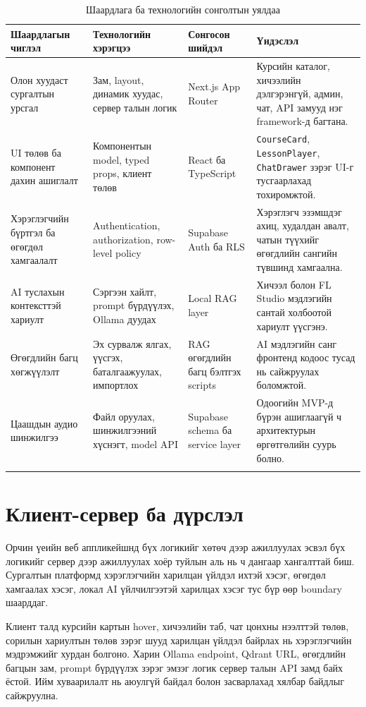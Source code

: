 \begin{longtable}{|p{}|p{}|p{}|p{}|}
  \hline
  \textbf{Шаардлагын чиглэл} & \textbf{Технологийн хэрэгцээ} & \textbf{Сонгосон шийдэл} & \textbf{Үндэслэл} \\ \hline
  Олон хуудаст сургалтын урсгал & Зам, layout, динамик хуудас, сервер талын логик & Next.js App Router & Курсийн каталог, хичээлийн дэлгэрэнгүй, админ, чат, API замууд нэг framework-д багтана. \\ \hline
  UI төлөв ба компонент дахин ашиглалт & Компонентын model, typed props, клиент төлөв & React ба TypeScript & \texttt{CourseCard}, \texttt{LessonPlayer}, \texttt{ChatDrawer} зэрэг UI-г тусгаарлахад тохиромжтой. \\ \hline
  Хэрэглэгчийн бүртгэл ба өгөгдөл хамгаалалт & Authentication, authorization, row-level policy & Supabase Auth ба RLS & Хэрэглэгч эзэмшдэг ахиц, худалдан авалт, чатын түүхийг өгөгдлийн сангийн түвшинд хамгаална. \\ \hline
  AI туслахын контексттэй хариулт & Сэргээн хайлт, prompt бүрдүүлэх, Ollama дуудах & Local RAG layer & Хичээл болон FL Studio мэдлэгийн сантай холбоотой хариулт үүсгэнэ. \\ \hline
  Өгөгдлийн багц хөгжүүлэлт & Эх сурвалж ялгах, үүсгэх, баталгаажуулах, импортлох & RAG өгөгдлийн багц бэлтгэх scripts & AI мэдлэгийн санг фронтенд кодоос тусад нь сайжруулах боломжтой. \\ \hline
  Цаашдын аудио шинжилгээ & Файл оруулах, шинжилгээний хүснэгт, model API & Supabase schema ба service layer & Одоогийн MVP-д бүрэн ашиглаагүй ч архитектурын өргөтгөлийн суурь болно. \\ \hline
  \caption{Шаардлага ба технологийн сонголтын уялдаа}
  \label{tab:req-tech-trace}
\end{longtable}

\section{Клиент-сервер ба дүрслэл}
Орчин үеийн веб аппликейшнд бүх логикийг хөтөч дээр ажиллуулах эсвэл бүх логикийг сервер дээр ажиллуулах хоёр туйлын аль нь ч дангаар хангалттай биш. Сургалтын платформд хэрэглэгчийн харилцан үйлдэл ихтэй хэсэг, өгөгдөл хамгаалах хэсэг, локал AI үйлчилгээтэй харилцах хэсэг тус бүр өөр boundary шаарддаг.

Клиент талд курсийн картын hover, хичээлийн таб, чат цонхны нээлттэй төлөв, сорилын хариултын төлөв зэрэг шууд харилцан үйлдэл байрлах нь хэрэглэгчийн мэдрэмжийг хурдан болгоно. Харин Ollama endpoint, Qdrant URL, өгөгдлийн багцын зам, prompt бүрдүүлэх зэрэг эмзэг логик сервер талын API замд байх ёстой. Ийм хуваарилалт нь аюулгүй байдал болон засварлахад хялбар байдлыг сайжруулна.

